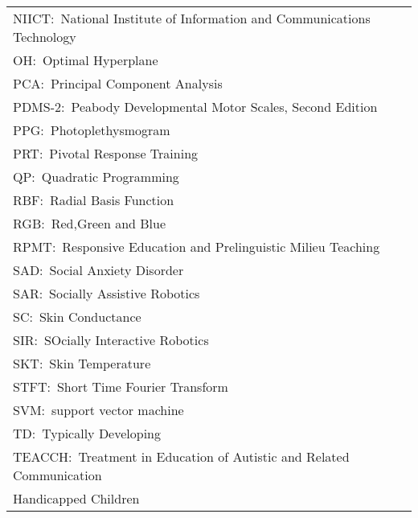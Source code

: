 \begin{longtable}{l}
NIICT:~National Institute of Information and Communications Technology\\
OH:~Optimal Hyperplane\\
PCA:~Principal Component Analysis\\
PDMS-2:~Peabody Developmental Motor Scales, Second Edition\\
PPG:~Photoplethysmogram\\
PRT:~Pivotal Response Training\\
QP:~Quadratic Programming\\
RBF:~Radial Basis Function\\
RGB:~Red,Green and Blue\\
RPMT:~Responsive Education and Prelinguistic Milieu Teaching\\
SAD:~Social Anxiety Disorder\\
SAR:~Socially Assistive Robotics\\
SC:~Skin Conductance\\
SIR:~SOcially Interactive Robotics\\
SKT:~Skin Temperature\\
STFT:~Short Time Fourier Transform\\
SVM:~support vector machine\\
TD:~Typically Developing\\
TEACCH:~Treatment in Education of Autistic and Related Communication \\Handicapped Children\\

\end{longtable}

